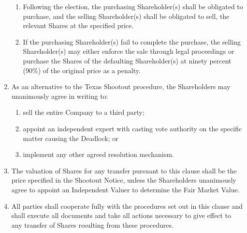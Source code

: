 \begin{enumerate}[label=(\alph*)]
\begin{enumerate}[label=(\roman*)]
    \item Following the election, the purchasing Shareholder(s) shall be obligated to purchase, and the selling Shareholder(s) shall be obligated to sell, the relevant Shares at the specified price.
    \item If the purchasing Shareholder(s) fail to complete the purchase, the selling Shareholder(s) may either enforce the sale through legal proceedings or purchase the Shares of the defaulting Shareholder(s) at ninety percent (90\%) of the original price as a penalty.
    \end{enumerate}
\item As an alternative to the Texas Shootout procedure, the Shareholders may unanimously agree in writing to:
    \begin{enumerate}[label=(\roman*)]
    \item sell the entire Company to a third party;
    \item appoint an independent expert with casting vote authority on the specific matter causing the Deadlock; or
    \item implement any other agreed resolution mechanism.
    \end{enumerate}
\item The valuation of Shares for any transfer pursuant to this clause shall be the price specified in the Shootout Notice, unless the Shareholders unanimously agree to appoint an Independent Valuer to determine the Fair Market Value.
\item All parties shall cooperate fully with the procedures set out in this clause and shall execute all documents and take all actions necessary to give effect to any transfer of Shares resulting from these procedures.
\end{enumerate} 